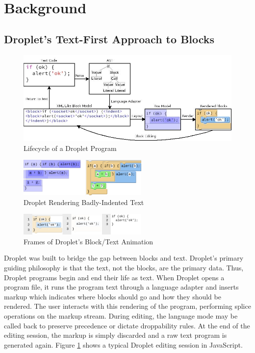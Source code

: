 \documentclass[conference]{IEEEtran}
\begin{document}
\section{Background}

\subsection{Droplet's Text-First Approach to Blocks}

\begin{figure}[!t]
\centering
\includegraphics[width=5in]{image11.jpg}
\caption{Lifecycle of a Droplet Program}
\label{lifecycle}
\end{figure}

\begin{figure}[!t]
\centering
\includegraphics[width=2.5in]{image05.png}
\caption{Droplet Rendering Badly-Indented Text}
\label{bad_layout}
\end{figure}

\begin{figure}[!t]
\centering
\includegraphics[width=2.5in]{image12.png}
\caption{Frames of Droplet's Block/Text Animation}
\label{anim}
\end{figure}

Droplet was built to bridge the gap between blocks and text. Droplet's primary guiding philosophy is that the text, not the blocks, are the primary data. Thus, Droplet programs begin and end their life as text. When Droplet opens a program file, it runs the program text through a language adapter and inserts markup which indicates where blocks should go and how they should be rendered. The user interacts with this rendering of the program, performing splice operations on the markup stream. During editing, the language mode may be called back to preserve precedence or dictate droppability rules. At the end of the editing session, the markup is simply discarded and a raw text program is generated again. Figure \ref{lifecycle} shows a typical Droplet editing session in JavaScript.
\end{document}
